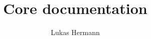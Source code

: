 \documentclass[12pt, a4paper]{article}
\begin{document}
\title{Core documentation}
\author{Lukas Hermann}
\maketitle

\tableofcontents

\newpage


\end{document}
